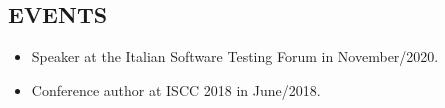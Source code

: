 \documentclass[margin]{res}
\begin{document}
\begin{resume}

			
		
		\section{EVENTS}
			\begin{itemize}
			    \item[] Speaker at the Italian Software Testing Forum in November/2020.
				\item[] Conference author at ISCC 2018 in June/2018.
			\end{itemize}


\end{resume}
\end{document}
